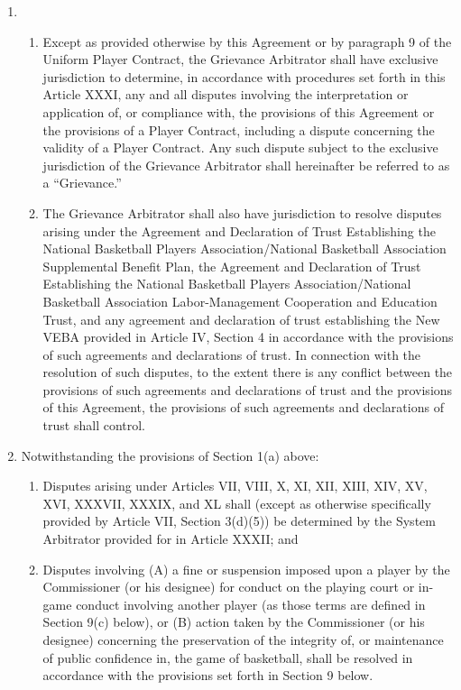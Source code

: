 \documentclass[
]{book}
\providecommand{\tightlist}{%
  \setlength{\itemsep}{0pt}\setlength{\parskip}{0pt}}
\begin{document}
\begin{enumerate}
\def\labelenumi{(\alph{enumi})}
\item
  \begin{enumerate}
  \def\labelenumii{(\roman{enumii})}
  \tightlist
  \item
    Except as provided otherwise by this Agreement or by paragraph 9 of the Uniform Player Contract, the Grievance Arbitrator shall have exclusive jurisdiction to determine, in accordance with procedures set forth in this Article XXXI, any and all disputes involving the interpretation or application of, or compliance with, the provisions of this Agreement or the provisions of a Player Contract, including a dispute concerning the validity of a Player Contract. Any such dispute subject to the exclusive jurisdiction of the Grievance Arbitrator shall hereinafter be referred to as a ``Grievance.''
  \item
    The Grievance Arbitrator shall also have jurisdiction to resolve disputes arising under the Agreement and Declaration of Trust Establishing the National Basketball Players Association/National Basketball Association Supplemental Benefit Plan, the Agreement and Declaration of Trust Establishing the National Basketball Players Association/National Basketball Association Labor-Management Cooperation and Education Trust, and any agreement and declaration of trust establishing the New VEBA provided in Article IV, Section 4 in accordance with the provisions of such agreements and declarations of trust. In connection with the resolution of such disputes, to the extent there is any conflict between the provisions of such agreements and declarations of trust and the provisions of this Agreement, the provisions of such agreements and declarations of trust shall control.
  \end{enumerate}
\item
  Notwithstanding the provisions of Section 1(a) above:

  \begin{enumerate}
  \def\labelenumii{(\roman{enumii})}
  \tightlist
  \item
    Disputes arising under Articles VII, VIII, X, XI, XII, XIII, XIV, XV, XVI, XXXVII, XXXIX, and XL shall (except as otherwise specifically provided by Article VII, Section 3(d)(5)) be determined by the System Arbitrator provided for in Article XXXII; and
  \item
    Disputes involving (A) a fine or suspension imposed upon a player by the Commissioner (or his designee) for conduct on the playing court or in-game conduct involving another player (as those terms are defined in Section 9(c) below), or (B) action taken by the Commissioner (or his designee) concerning the preservation of the integrity of, or maintenance of public confidence in, the game of basketball, shall be resolved in accordance with the provisions set forth in Section 9 below.
  \end{enumerate}
\end{enumerate}
\end{document}
